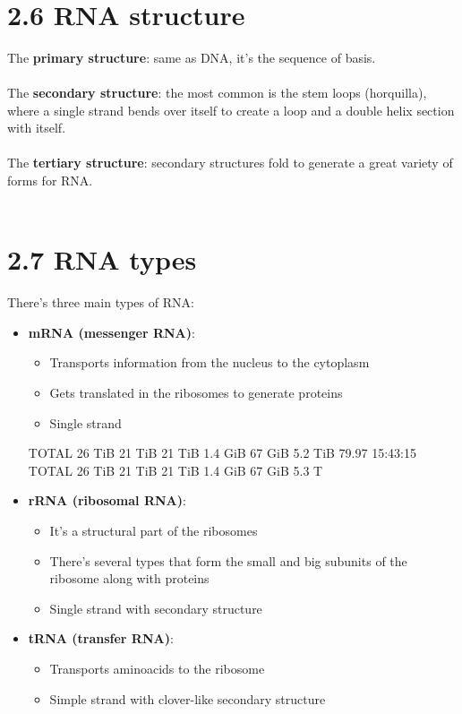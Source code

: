 \documentclass[a4paper,landscape,10pt]{cheatsheet}
\begin{document}
\hfil\\
\section*{2.6 RNA structure}
The \textbf{primary structure}: same as DNA, it's the sequence of basis.\\
\hfill\\
The \textbf{secondary structure}: the most common is the stem loops (horquilla), where a single strand bends over itself
to create a loop and a double helix section with itself.\\
\hfill\\
The \textbf{tertiary structure}: secondary structures fold to generate a great variety of forms for RNA.\\

\hfil\\
\section*{2.7 RNA types}
There's three main types of RNA:\\
\begin{itemize}
  \item \textbf{mRNA (messenger RNA)}:
        \begin{itemize}
          \item Transports information from the nucleus to the cytoplasm
          \item Gets translated in the ribosomes to generate proteins
          \item Single strand
        \end{itemize}TOTAL   26 TiB   21 TiB   21 TiB  1.4 GiB   67 GiB  5.2 TiB  79.97
        15:43:15 TOTAL   26 TiB   21 TiB   21 TiB  1.4 GiB   67 GiB  5.3 T

  \item \textbf{rRNA (ribosomal RNA)}:
        \begin{itemize}
          \item It's a structural part of the ribosomes
          \item There's several types that form the small and big subunits of the ribosome along with proteins
          \item Single strand with secondary structure
        \end{itemize}

  \item \textbf{tRNA (transfer RNA)}:
        \begin{itemize}
          \item Transports aminoacids to the ribosome
          \item Simple strand with clover-like secondary structure
        \end{itemize}
\end{itemize}
\end{document}
